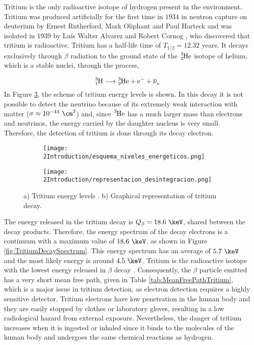 Tritium is the only radioactive isotope of hydrogen present in the environment. Tritium was produced artificially for the first time in $1934$ in neutron capture on deuterium by Ernest Rutherford, Mark Oliphant and Paul Harteck \cite{TritiumDiscovery} and was isolated in 1939 by Luis Walter Alvarez and Robert Cornog \cite{TritiumIsolate}, who discovered that tritium is radioactive. Tritium has a half-life time of $T_{1/2}= 12.32$ years. It decays exclusively through $\beta$ radiation to the ground state of the $\ce{^{3}_{2}He}$ isotope of helium, which is a stable nuclei, through the process,

\begin{equation}
\ce{^{3}_{1}H} \longrightarrow \ce{^{3}_{2}He}  + \ce{e^-}  + \ce{\overline{\nu}_e}
\label{eq:TritiumDecay}
\end{equation}
In Figure \ref{fig:TritiumDecay}, the scheme of tritium energy levels is shown. In this decay it is not possible to detect the neutrino because of its extremely weak interaction with matter ($\sigma \approx 10^{-44} ~ \cm^2$) \cite{CrossSeccionNeutrino} and, since $\ce{^{3}He}$ has a much larger mass than electrons and neutrinos, the energy carried by the daughter nucleus is very small. Therefore, the detection of tritium is done through its decay electron. 

\begin{figure}
\centering
    \begin{subfigure}[b]{0.85\textwidth}
    \centering
    \texttt{[image: 2Introduction/esquema\_niveles\_energeticos.png]}  
    \caption{\label{subfig:Energy_levels}}
    \end{subfigure}
    \hfill
    \begin{subfigure}[b]{0.7\textwidth}
    \centering
    \texttt{[image: 2Introduction/representacion\_desintegracion.png]}  
    \caption{\label{subfig:GraphicDesintegration}}
    \end{subfigure}
 \caption{a) Tritium energy levels \cite{TritiumDecayEnergyLevels}. b) Graphical representation of tritium decay.}
 \label{fig:TritiumDecay}
\end{figure}

The energy released in the tritium decay is $Q_\beta=18.6~\keV$, shared between the decay products. Therefore, the energy spectrum of the decay electrons is a continuum with a maximum value of $18.6~\keV$, as shown in Figure \ref{fig:TritiumDecaySpectrum}. This energy spectrum has an average of $5.7~\keV$ and the most likely energy is around $4.5~\keV$. Tritium is the radioactive isotope with the lowest energy released in $\beta$ decay \cite{TritiumHandling}. Consequently, the $\beta$ particle emitted has a very short mean free path, given in Table \ref{tab:MeanFreePathTritium}, which is a major issue in tritium detection, as electron detection requires a highly sensitive detector. Tritium electrons have low penetration in the human body and they are easily stopped by clothes or laboratory gloves, resulting in a low radiological hazard from external exposure. Nevertheless, the danger of tritium increases when it is ingested or inhaled since it binds to the molecules of the human body and undergoes the same chemical reactions as hydrogen.

